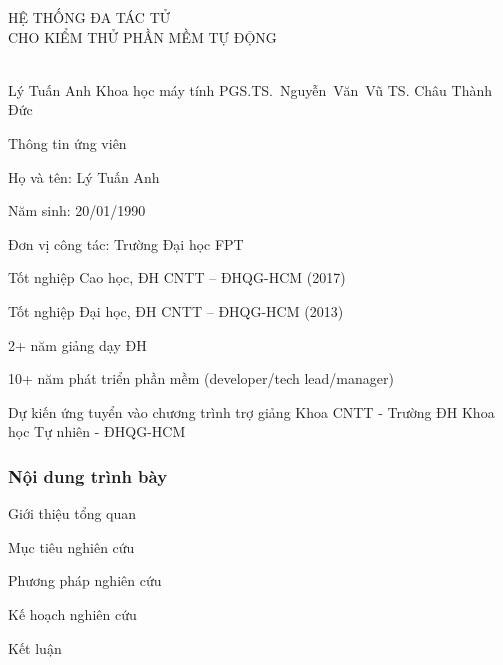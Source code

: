 \begin{frame}[plain]
    \centering
    \vspace*{0.5cm}
    \SchoolHeader

    {\TitleFont\Large HỆ THỐNG ĐA TÁC TỬ}\\[0.20em]
    {\TitleFont\Large CHO KIỂM THỬ PHẦN MỀM TỰ ĐỘNG}\\[0.95em]

    \Divider\\[1.0em]
    \vfill

    \InfoRow
    {Lý Tuấn Anh}
    {Khoa học máy tính}
    {\mbox{PGS.TS. Nguyễn Văn Vũ}}
    {TS. Châu Thành Đức}
\end{frame}

\begin{frame}{Thông tin ứng viên}
    \begin{BulletTight}
        \item Họ và tên: Lý Tuấn Anh
        \item Năm sinh: 20/01/1990
        \item Đơn vị công tác: Trường Đại học FPT
        \item Tốt nghiệp Cao học, ĐH CNTT – ĐHQG-HCM (2017)
        \item Tốt nghiệp Đại học, ĐH CNTT – ĐHQG-HCM (2013)
        \item 2+ năm giảng dạy ĐH
        \item 10+ năm phát triển phần mềm (developer/tech lead/manager)
        \item Dự kiến ứng tuyển vào chương trình trợ giảng Khoa CNTT - Trường ĐH Khoa học Tự nhiên - ĐHQG-HCM
    \end{BulletTight}
\end{frame}

\begin{frame}
    \frametitle{Nội dung trình bày}

    \vspace{0.8em}
    {\large %
        \begin{BulletTight}
            \item Giới thiệu tổng quan
            \item Mục tiêu nghiên cứu
            \item Phương pháp nghiên cứu
            \item Kế hoạch nghiên cứu
            \item Kết luận
        \end{BulletTight}
    }
\end{frame}
